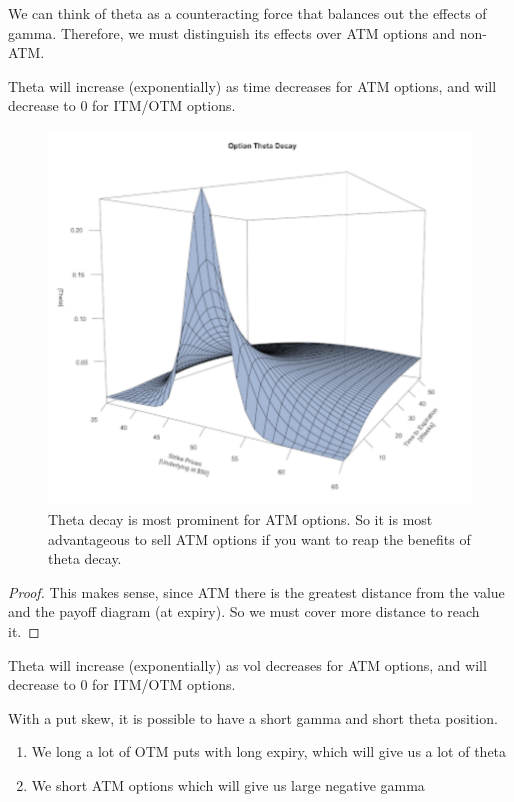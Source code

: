 \documentclass{article}
\begin{document}
    We can think of theta as a counteracting force that balances out the effects of gamma. Therefore, we must distinguish its effects over ATM options and non-ATM. 

    \begin{theorem}
      Theta will increase (exponentially) as time decreases for ATM options, and will decrease to $0$ for ITM/OTM options. 
      \begin{figure}[H]
        \centering 
        \includegraphics[scale=0.4]{img/theta_wrt_time.png}
        \caption{Theta decay is most prominent for ATM options. So it is most advantageous to sell ATM options if you want to reap the benefits of theta decay. } 
        \label{fig:theta_wrt_time}
      \end{figure}
    \end{theorem}
    \begin{proof}
      This makes sense, since ATM there is the greatest distance from the value and the payoff diagram (at expiry). So we must cover more distance to reach it. 
    \end{proof}

    \begin{theorem}
      Theta will increase (exponentially) as vol decreases for ATM options, and will decrease to $0$ for ITM/OTM options. 
    \end{theorem}

    \begin{example}
      With a put skew, it is possible to have a short gamma and short theta position.
      \begin{enumerate}
        \item We long a lot of OTM puts with long expiry, which will give us a lot of theta
        \item We short ATM options which will give us large negative gamma
      \end{enumerate}
    \end{example}
\end{document}

